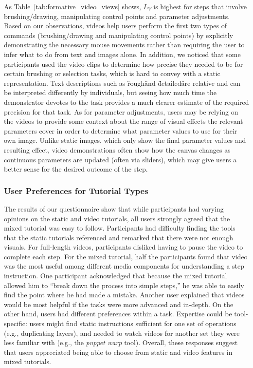 As Table~\ref{tab:formative_video_views} shows, $L_V$ is highest for steps that involve brushing/drawing, manipulating control points and parameter adjustments. Based on our observations, videos help users perform the first two types of commands (brushing/drawing and manipulating control points) by explicitly demonstrating the necessary mouse movements rather than requiring the user to infer what to do from text and images alone. In addition, we noticed that some participants used the video clips to determine how precise they needed to be for certain brushing or selection tasks, which is hard to convey with a static representation. Text descriptions such as \"rough\" and \"detailed\" are relative and can be interpreted differently by individuals, but seeing how much time the demonstrator devotes to the task provides a much clearer estimate of the required precision for that task. As for parameter adjustments, users may be relying on the videos to provide some context about the range of visual effects the relevant parameters cover in order to determine what parameter values to use for their own image. Unlike static images, which only show the final parameter values and resulting effect, video demonstrations often show how the canvas changes as continuous parameters are updated (often via sliders), which may give users a better sense for the desired outcome of the step.

\subsubsection{User Preferences for Tutorial Types}
The results of our questionnaire show that while participants had varying opinions on the static and video tutorials, all users strongly agreed that the mixed tutorial was easy to follow. Participants had difficulty finding the tools that the static tutorials referenced and remarked that there were not enough visuals. For full-length videos, participants disliked having to pause the video to complete each step. For the mixed tutorial, half the participants found that video was the most useful among different media components for understanding a step instruction. One participant acknowledged that because the mixed tutorial allowed him to “break down the process into simple steps,” he was able to easily find the point where he had made a mistake. Another user explained that videos would be most helpful if the tasks were more advanced and in-depth. On the other hand, users had different preferences within a task. Expertise could be tool-specific: users might find static instructions sufficient for one set of operations (e.g., duplicating layers), and needed to watch videos for another set they were less familiar with (e.g., the \emph{puppet warp} tool). Overall, these responses suggest that users appreciated being able to choose from static and video features in mixed tutorials.

